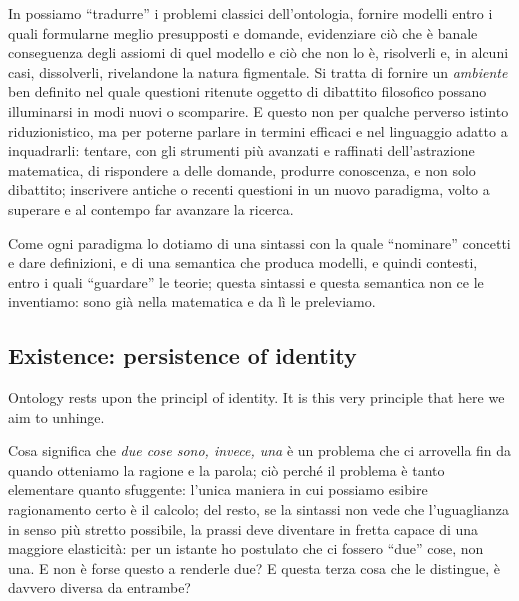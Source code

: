 In \CT possiamo ``tradurre'' i problemi classici dell'ontologia, fornire modelli entro i quali formularne meglio presupposti e domande, evidenziare ciò che è banale conseguenza degli assiomi di quel modello e ciò che non lo è, risolverli e, in alcuni casi, dissolverli, rivelandone la natura figmentale. Si tratta di fornire un \emph{ambiente} ben definito nel quale questioni ritenute oggetto di dibattito filosofico possano illuminarsi in modi nuovi o scomparire. E questo non per qualche perverso istinto riduzionistico, ma per poterne parlare in termini efficaci e nel linguaggio adatto a inquadrarli: tentare, con gli strumenti più avanzati e raffinati dell'astrazione matematica, di rispondere a delle domande, produrre conoscenza, e non solo dibattito; inscrivere antiche o recenti questioni in un nuovo paradigma, volto a superare e al contempo far avanzare la ricerca.

Come ogni paradigma lo dotiamo di una sintassi con la quale ``nominare'' concetti e dare definizioni, e di una semantica che produca modelli, e quindi contesti, entro i quali ``guardare'' le teorie; questa sintassi e questa semantica non ce le inventiamo: sono già nella matematica e da lì le preleviamo.
\subsection{Existence: persistence of identity}
Ontology rests upon the principl of identity. It is this very principle that here we aim to unhinge.

Cosa significa che \emph{due cose sono, invece, una} è un problema che ci arrovella fin da quando otteniamo la ragione e la parola; ciò perché il problema è tanto elementare quanto sfuggente: l'unica maniera in cui possiamo esibire ragionamento certo è il calcolo; del resto, se la sintassi non vede che l'uguaglianza in senso più stretto possibile, la prassi deve diventare in fretta capace di una maggiore elasticità: per un istante ho postulato che ci fossero ``due'' cose, non una. E non è forse questo a renderle due? E questa terza cosa che le distingue, è davvero diversa da entrambe?

